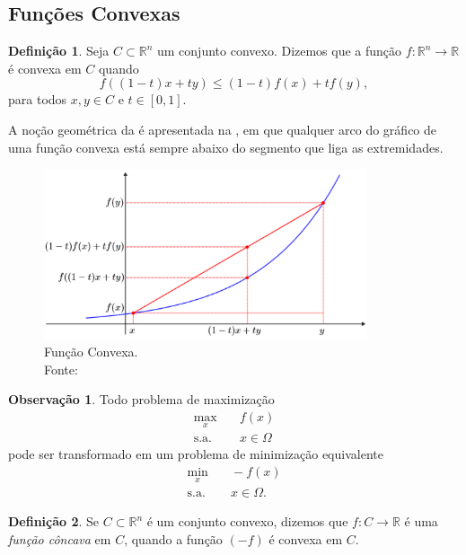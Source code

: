 \documentclass[12pt,a4paper]{scrartcl}
\def\RR{\mathds{R}}
\theoremstyle{definition}%
\newtheorem{defi}{Definição}
\newtheorem{obs}{Observação}
\begin{document}
\subsection{Funções Convexas}

\begin{defi} \label{defi:funcao_convexa}
Seja $C \subset \RR^{n}$ um conjunto convexo. Dizemos que a função $f: \RR^{n} \rightarrow \RR$ é convexa em $C$ quando
\[
f((1-t)x + ty) \leq (1-t)f(x) + tf(y),
\]
para todos $x,y \in C$ e $t \in [0,1]$.
\end{defi}


A noção geométrica da  é apresentada na , em que qualquer arco do gráfico de uma função convexa está sempre abaixo do segmento que liga as extremidades.


\begin{figure}[!h] 
	\centering
	\includegraphics[width=0.85\textwidth]{funcao_convexa}
	\caption{ Função Convexa. \label{fig_funcao_convexa} \\ Fonte: \textcite{Evelin2017}}
\end{figure}


\begin{obs}
Todo problema de maximização
\[
\begin{aligned}
\max_{x} & \quad f(x) \\
\text{s.a.} & \quad x \in \Omega \end{aligned}
 \]
pode ser transformado em um problema de minimização equivalente
\[
\begin{aligned}
\min_{x} & \quad -f(x) \\
\text{s.a.} & \quad x \in \Omega .\end{aligned}
 \]
\end{obs}


\begin{defi}
Se $C \subset \RR^{n}$ é um conjunto convexo, dizemos que $f: C \rightarrow \RR $ é uma \emph{função côncava} em $C$, quando a função $(-f)$ é convexa em $C$.
\end{defi}
\end{document}
